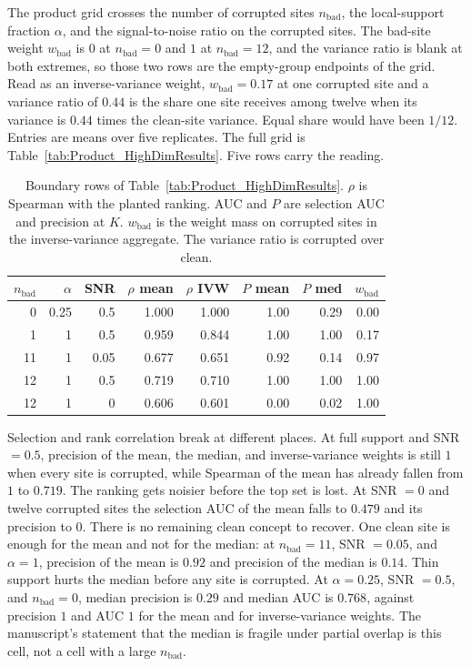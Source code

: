 The product grid crosses the number of corrupted sites $n_{\mathrm{bad}}$,
the local-support fraction $\alpha$, and the signal-to-noise ratio on the
corrupted sites.
The bad-site weight $w_{\mathrm{bad}}$ is $0$ at $n_{\mathrm{bad}}=0$ and
$1$ at $n_{\mathrm{bad}}=12$, and the variance ratio is blank at both
extremes, so those two rows are the empty-group endpoints of the grid.
Read as an inverse-variance weight, $w_{\mathrm{bad}}=0.17$ at one
corrupted site and a variance ratio of $0.44$ is the share one site
receives among twelve when its variance is $0.44$ times the clean-site
variance. Equal share would have been $1/12$.
Entries are means over five replicates.
The full grid is Table~\ref{tab:Product_HighDimResults}.
Five rows carry the reading.

\begin{table}[t]
\centering
\caption{Boundary rows of Table~\ref{tab:Product_HighDimResults}.
$\rho$ is Spearman with the planted ranking.
AUC and $P$ are selection AUC and precision at $K$.
$w_{\mathrm{bad}}$ is the weight mass on corrupted sites in the
inverse-variance aggregate.
The variance ratio is corrupted over clean.}
\label{tab:hidim-boundary}
\small
\begin{tabular}{rrrrrrrr}
\toprule
$n_{\mathrm{bad}}$ & $\alpha$ & SNR & $\rho$ mean & $\rho$ IVW & $P$ mean & $P$ med & $w_{\mathrm{bad}}$ \\
\midrule
0 & 0.25 & 0.5 & 1.000 & 1.000 & 1.00 & 0.29 & 0.00 \\
1 & 1 & 0.5 & 0.959 & 0.844 & 1.00 & 1.00 & 0.17 \\
11 & 1 & 0.05 & 0.677 & 0.651 & 0.92 & 0.14 & 0.97 \\
12 & 1 & 0.5 & 0.719 & 0.710 & 1.00 & 1.00 & 1.00 \\
12 & 1 & 0 & 0.606 & 0.601 & 0.00 & 0.02 & 1.00 \\
\bottomrule
\end{tabular}
\end{table}

Selection and rank correlation break at different places.
At full support and SNR $=0.5$, precision of the mean, the median, and
inverse-variance weights is still $1$ when every site is corrupted, while
Spearman of the mean has already fallen from $1$ to $0.719$.
The ranking gets noisier before the top set is lost.
At SNR $=0$ and twelve corrupted sites the selection AUC of the mean falls
to $0.479$ and its precision to $0$.
There is no remaining clean concept to recover.
One clean site is enough for the mean and not for the median: at
$n_{\mathrm{bad}}=11$, SNR $=0.05$, and $\alpha=1$, precision of the mean
is $0.92$ and precision of the median is $0.14$.
Thin support hurts the median before any site is corrupted.
At $\alpha=0.25$, SNR $=0.5$, and $n_{\mathrm{bad}}=0$, median precision
is $0.29$ and median AUC is $0.768$, against precision $1$ and AUC $1$ for
the mean and for inverse-variance weights.
The manuscript's statement that the median is fragile under partial overlap
is this cell, not a cell with a large $n_{\mathrm{bad}}$.

